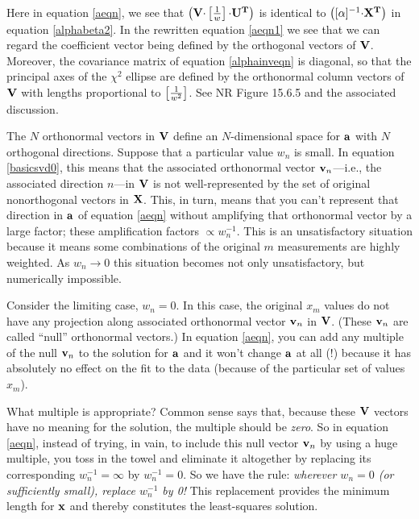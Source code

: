 \documentclass[psfig,preprint]{aastex}
\begin{document}
\noindent Here in equation \ref{aeqn}, we see that $\left( \mathbf{V
\cdot} \left[ {1 \over w} \right] \mathbf{ \cdot U^T } \right)$ is
identical to $\left( [\alpha]^{-1} {\bf \cdot X^T} \right)$ in equation
\ref{alphabeta2}. In the rewritten equation \ref{aeqn1} we see that we
can regard the coefficient vector being defined by the orthogonal
vectors of $\bf V$. Moreover, the covariance matrix of equation
\ref{alphainveqn} is diagonal, so that the principal axes of the
$\chi^2$ ellipse are defined by the orthonormal column vectors of $\bf
V$ with lengths proportional to $\left[ 1 \over w^2 \right]$. See NR
Figure 15.6.5 and the associated discussion.

The $N$ orthonormal vectors in $\bf V$ define an $N$-dimensional space
for $\bf a$ with $N$ orthogonal directions.  Suppose that a particular
value $w_n$ is small. In equation \ref{basicsvd0}, this means that the
associated orthonormal vector ${\bf v}_n$---i.e., the associated
direction $n$---in $\bf V$ is not well-represented by the set of
original nonorthogonal vectors in $\bf X$. This, in turn, means that you
can't represent that direction in $\bf a$ of equation \ref{aeqn} without
amplifying that orthonormal vector by a large factor; these
amplification factors $\propto w_n^{-1}$. This is an unsatisfactory
situation because it means some combinations of the original $m$
measurements are highly weighted. As $w_n \rightarrow 0$ this situation
becomes not only unsatisfactory, but numerically impossible.

Consider the limiting case, $w_n=0$.  In this case, the original $x_m$
values do not have any projection along associated orthonormal vector
${\bf v}_n$ in $\bf V$. (These ${\bf v}_n$ are called ``null''
orthonormal vectors.)  In equation \ref{aeqn}, you can add any multiple
of the null ${\bf v}_n$ to the solution for $\bf a$ and it won't change
$\bf a$ at all (!) because it has absolutely no effect on the fit to the
data (because of the particular set of values $x_m$).

What multiple is appropriate? Common sense says that, because these $\bf
V$ vectors have no meaning for the solution, the multiple should be {\it
zero}.  So in equation \ref{aeqn}, instead of trying, in vain, to
include this null vector ${\bf v}_n$ by using a huge multiple, you toss
in the towel and eliminate it altogether by replacing its corresponding
$w_n^{-1} = \infty$ by $w_n^{-1} = 0$. So we have the rule: {\it
wherever $w_n = 0$ (or sufficiently small), replace $w_n^{-1}$ by 0!}
This replacement provides the minimum length for $\bf x$ and thereby
constitutes the least-squares solution.
\end{document}
